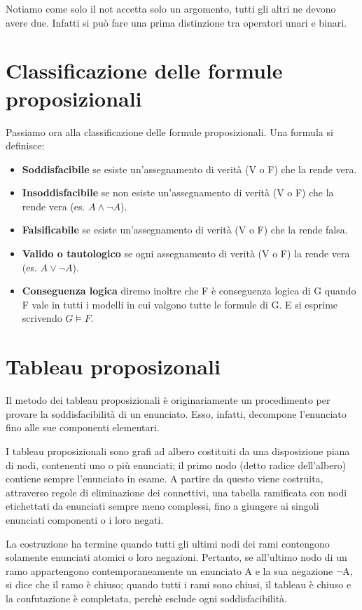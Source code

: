 Notiamo come solo il not accetta solo un argomento, tutti gli altri ne devono avere due. Infatti si può fare una prima distinzione tra operatori unari e binari.

\section{Classificazione delle formule proposizionali}
Passiamo ora alla classificazione delle formule proposizionali. Una formula si definisce:
\begin{itemize}
    \item \textbf{Soddisfacibile} se esiste un'assegnamento di verità (V o F) che la rende vera.
    \item \textbf{Insoddisfacibile} se non esiste un'assegnamento di verità (V o F) che la rende vera (es. $A\land\neg A$).
    \item \textbf{Falsificabile} se esiste un'assegnamento di verità (V o F) che la rende falsa.
    \item \textbf{Valido o tautologico} se ogni assegnamento di verità (V o F) la rende vera (es. $A\lor\neg A$).
    \item \textbf{Conseguenza logica} diremo inoltre che F è
conseguenza logica di G quando F vale in tutti i modelli in cui valgono tutte le formule di G. E si esprime scrivendo $G\models F$.
\end{itemize}

\section{Tableau proposizonali}
Il metodo dei tableau proposizionali è originariamente un procedimento per provare la soddisfacibilità di un enunciato. Esso, infatti, decompone l’enunciato fino alle sue componenti elementari.

I tableau proposizionali sono grafi ad albero costituiti da una disposizione piana di nodi, contenenti uno o più enunciati; il primo nodo (detto radice dell’albero) contiene sempre l’enunciato in esame. A partire da questo viene costruita, attraverso regole di eliminazione dei connettivi, una tabella ramificata con nodi etichettati da enunciati sempre meno complessi, fino a giungere ai singoli enunciati componenti o i loro negati.

La costruzione ha termine quando tutti gli ultimi nodi dei rami contengono solamente enunciati atomici o loro negazioni.
Pertanto, se all’ultimo nodo di un ramo appartengono contemporaneamente un enunciato A e la sua negazione $\neg$A, si dice che il ramo è chiuso; quando tutti i rami sono chiusi, il tableau è chiuso e la confutazione è completata, perchè esclude ogni soddisfacibilità.

